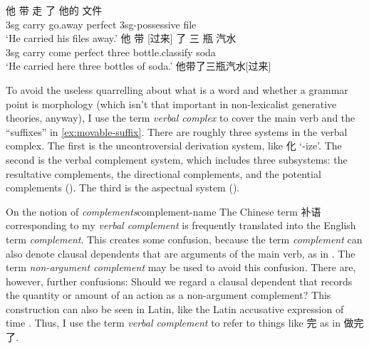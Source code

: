 \documentclass[UTF8, a4paper, oneside, scheme=plain]{ctexrep}
\newcommand*{\citesec}[1]{\S~{#1}}
\newcommand*{\term}[1]{\emph{#1}}
\newcommand{\translate}[1]{`#1'}
\begin{document}
\begin{exe}
    \ex \begin{xlist}
        \ex \gll 他 带 走 了 他的 文件  \\ 
        3sg carry go.away \acs{perfect} 3sg-\acs{possessive} file \\
        \glt \translate{He carried his files away.}
        \ex \gll 他 带 [过来] 了 三 瓶 汽水 \\
        3sg carry come \acs{perfect} three bottle.\acs{classify} soda \\
        \glt \translate{He carried here three bottles of soda.} 
        \label{ex:sanpinqishuiugolai-1}
        \ex 他带了三瓶汽水[过来]
        \label{ex:sanpinqishuiugolai-2}
    \end{xlist}
    \label{ex:movable-suffix}
\end{exe}

To avoid the useless quarrelling about what is a word and whether a grammar point is morphology
(which isn't that important in non-lexicalist generative theories, anyway),
I use the term \term{verbal complex} to cover 
the main verb and the  ``suffixes'' in \eqref{ex:movable-suffix}.
There are roughly three systems in the verbal complex.
The first is the uncontroversial derivation system,
like 化 \translate{-ize}.
The second is the verbal complement system,
which includes three subsystems:
the resultative complements, the directional complements, 
and the potential complements ().
The third is the aspectual system ().

\begin{infobox}{On the notion of \term{complements}}{complement-name}
    The Chinese term 补语 corresponding to my \term{verbal complement}
    is frequently translated into the English term \term{complement}.
    This creates some confusion,
    because the term \term{complement} can also denote 
    clausal dependents that are arguments of the main verb, as in \citet{cgel}.
    The term \term{non-argument complement} may be used to avoid this confusion.
    There are, however, further confusions:
    Should we regard a clausal dependent that records the quantity or amount of an action 
    as a non-argument complement?
    This construction can also be seen in Latin, 
    like the Latin accusative expression of time \citep[\citesec{423}]{greenough2013allen}.
    Thus, I use the term \term{verbal complement} to refer to 
    things like 完 as in 做完了.
\end{infobox}
\end{document}
